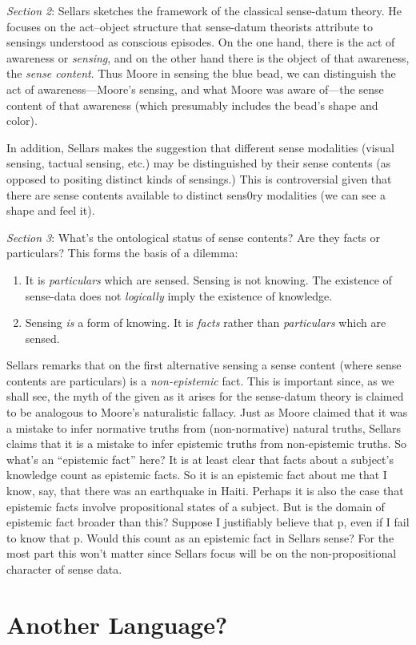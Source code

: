 \documentclass[11pt]{article}
\begin{document}
\emph{Section 2}: Sellars sketches the framework of the classical sense-datum theory. He focuses on the act--object structure that sense-datum theorists attribute to sensings understood as conscious episodes. On the one hand, there is the act of awareness or \emph{sensing}, and on the other hand there is the object of that awareness, the \emph{sense content}. Thus Moore in sensing the blue bead, we can distinguish the act of awareness---Moore's sensing, and what Moore was aware of---the sense content of that awareness (which presumably includes the bead's shape and color).

In addition, Sellars makes the suggestion that different sense modalities (visual sensing, tactual sensing, etc.) may be distinguished by their sense contents (as opposed to positing distinct kinds of sensings.) This is controversial given that there are sense contents available to distinct sens0ry modalities (we can see a shape and feel it).

\emph{Section 3}: What's the ontological status of sense contents? Are they facts or particulars? This forms the basis of a dilemma:
\begin{enumerate}
	\item It is \emph{particulars} which are sensed. Sensing is not knowing. The existence of sense-data does not \emph{logically} imply the existence of knowledge.
	\item Sensing \emph{is} a form of knowing. It is \emph{facts} rather than \emph{particulars} which are sensed.
\end{enumerate}

Sellars remarks that on the first alternative sensing a sense content (where sense contents are particulars) is a \emph{non-epistemic} fact. This is important since, as we shall see, the myth of the given as it arises for the sense-datum theory is claimed to be analogous to Moore's naturalistic fallacy. Just as Moore claimed that it was a mistake to infer normative truths from (non-normative) natural truths, Sellars claims that it is a mistake to infer epistemic truths from non-epistemic truths. So what's an ``epistemic fact'' here? It is at least clear that facts about a subject's knowledge count as epistemic facts. So it is an epistemic fact about me that I know, say, that there was an earthquake in Haiti. Perhaps it is also the case that epistemic facts involve propositional states of a subject. But is the domain of epistemic fact broader than this? Suppose I justifiably believe that p, even if I fail to know that p. Would this count as an epistemic fact in Sellars sense? For the most part this won't matter since Sellars focus will be on the non-propositional character of sense data.


\section{Another Language?} %
\label{sec:another_language_}

\end{document}
